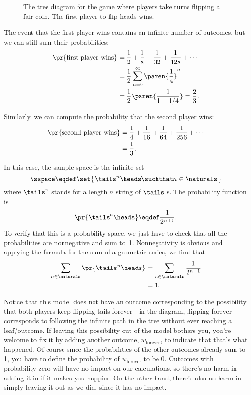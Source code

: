 \begin{figure}


\caption{The tree diagram for the game where players take turns
  flipping a fair coin.  The first player to flip heads wins.}

\label{fig:14A15}

\end{figure}

The event that the first player wins contains an infinite number of
outcomes, but we can still sum their probabilities:
\begin{align*}
\pr{\text{first player wins}}
    & = \frac{1}{2} + \frac{1}{8} + \frac{1}{32} + \frac{1}{128} + \cdots \\
    & = \frac{1}{2} \sum_{n=0}^\infty \paren{\frac{1}{4}}^n \\
    & = \frac{1}{2}\paren{\frac{1}{1-1/4}} = \frac{2}{3}.
\end{align*}

Similarly, we can compute the probability that the second player wins:
\begin{align*}
\pr{\text{second player wins}}
    & = \frac{1}{4} + \frac{1}{16} + \frac{1}{64} + \frac{1}{256}
                      + \cdots \\
    & = \frac{1}{3}.
\end{align*}

In this case, the sample space is the infinite set
\[
    \sspace \eqdef \set{\, \tails^n\heads \suchthat n \in \naturals \,}
\]
where $\tails^n$ stands for a length $n$ string of $\tails$'s.
The probability function is
\[
\pr{\tails^n\heads} \eqdef \frac{1}{2^{n+1}}.
\]
To verify that this is a probability space, we just have to check that
all the probabilities are nonnegative and sum to~1.  Nonnegativity is
obvious and applying the formula for the sum of a geometric series, we
find that
\begin{align*}
\sum_{n \in \naturals} \pr{\tails^n\heads}
    &= \sum_{n \in \naturals} \frac{1}{2^{n+1}} \\
    &= 1.
\end{align*}

Notice that this model does not have an outcome corresponding to the
possibility that both players keep flipping tails forever---in the
diagram, flipping forever corresponds to following the infinite path
in the tree without ever reaching a leaf/outcome.  If leaving this
possibility out of the model bothers you, you're welcome to fix it by
adding another outcome, $w_{\text{forever}}$, to indicate that that's
what happened.  Of course since the probabilities of the other
outcomes already sum to 1, you have to define the probability of
$w_{\text{forever}}$ to be 0.  Outcomes with probability zero will
have no impact on our calculations, so there's no harm in adding it in
if it makes you happier.  On the other hand, there's also no harm in
simply leaving it out as we did, since it has no impact.

